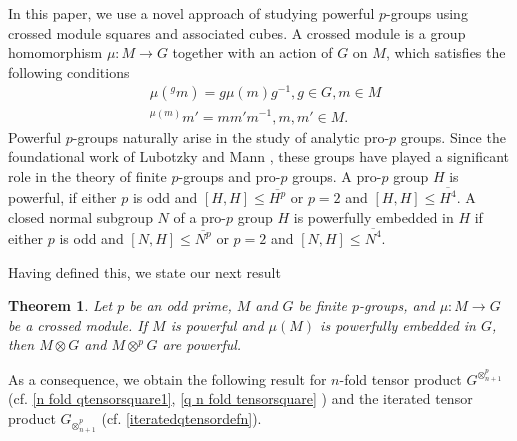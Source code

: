 \documentclass[12pt]{elsarticle}
\makeatletter
\newtheorem{theorem}{Theorem}[section]
\newtheorem*{main corollary*}{Main Corollary}
\theoremstyle{definition}
\newcommand{\ptens}{
	\otimes^p}
\newcommand{\settheoremtag}[1]{%
  \let\oldthetheorem\thetheorem%
  \renewcommand{\thetheorem}{#1}%
  \g@addto@macro\endtheorem{%
    \global\let\thetheorem\oldthetheorem}%
  }
\makeatother
\begin{document}
In this paper, we use a novel approach of studying powerful $p$-groups using crossed module squares and associated cubes.  A crossed module is a group homomorphism $\mu: M \to G$ together with an action of $G$ on $M$, which satisfies the following conditions
\begin{align}
    &\mu(^g m)=g\mu(m)g^{-1} , g\in G, m\in M\nonumber\\
        &^{\mu(m)}m'=mm'm^{-1}, m,m'\in M \nonumber.
\end{align}
Powerful $p$-groups naturally arise in the study of analytic pro-$p$ groups. Since the foundational work of Lubotzky and Mann \cite{LM87, LM872}, these groups have played a significant role in the theory of finite $p$-groups and pro-$p$ groups. A pro-$p$ group $H$ is powerful, if either $p$ is odd and $[H,H] \leqslant \overline{H^p}$ or $p=2$ and $[H,H] \leqslant \overline{H^4}$. A closed normal subgroup $N$ of a pro-$p$ group $H$ is powerfully embedded in $H$ if either $p$ is odd and $[N, H] \leqslant \overline{N^p}$ or $p=2$ and $[N, H] \leqslant \overline{N^4}$.


Having defined this, we state our next result
\settheoremtag{C}
\begin{theorem} \label{MR: M tensor G and M ptensor G are powerful}
    Let $p$ be an odd prime, $M$ and $G$ be finite $p$-groups, and ${\mu:M\to G}$ be a crossed module. If $M$ is powerful and $\mu(M)$ is powerfully embedded in $G$, then $M\otimes G$ and $M\ptens G$ are powerful.
\end{theorem}
As a consequence, we obtain the following result for $n$-fold tensor product $G^{\otimes^p_{n+1}}$ (cf. \eqref{n fold qtensorsquare1}, \eqref{q n fold tensorsquare}  ) and the iterated tensor product $G_{\otimes^p_{n+1}}$ {(cf. \eqref{iteratedqtensordefn})}. 
\end{document}
